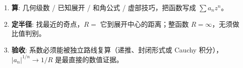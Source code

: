 \documentclass[11pt,a4paper]{ctexart}
\theoremstyle{definition}
\begin{document}
\vspace{1.2ex}
\begin{keybox}[把方法压缩成三句]
\begin{enumerate}[leftmargin=1.6em,itemsep=0.15ex,topsep=0.2ex]
\item \textbf{算}: 几何级数 / 已知展开 / 和角公式 / 虚部技巧，把函数写成 $\sum a_nz^n$。
\item \textbf{定半径}: 找最近的奇点，$R=$ 它到展开中心的距离；整函数 $R=\infty$，无须做比值判别。
\item \textbf{验收}: 系数必须能被独立路线复算（递推、封闭形式或 Cauchy 积分），$|a_n|^{1/n}\to1/R$ 是最直接的数值证据。
\end{enumerate}
\end{keybox}
\end{document}
